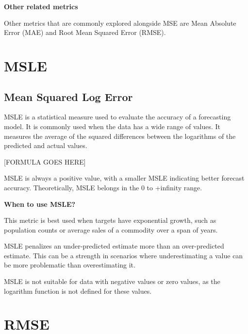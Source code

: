 \textbf{Other related metrics}

Other metrics that are commonly explored alongside MSE are Mean Absolute Error (MAE) and Root Mean Squared Error (RMSE).

\clearpage
\thispagestyle{regressionstyle}
\section{MSLE}
\subsection{Mean Squared Log Error}

MSLE is a statistical measure used to evaluate the accuracy of a forecasting model.
It is commonly used when the data has a wide range of values.
It measures the average of the squared differences between the logarithms of the predicted and actual values.

\begin{center}
    [FORMULA GOES HERE]
\end{center}
    
MSLE is always a positive value, with a smaller MSLE indicating better forecast accuracy. Theoretically, MSLE belongs in the 0 to +infinity range.

\textbf{When to use MSLE?}

This metric is best used when targets have exponential growth, such as population counts or average sales of a commodity over a span of years.

{
    \item MSLE penalizes an under-predicted estimate more than an over-predicted estimate. This can be a strength in scenarios where underestimating a value can be more problematic than overestimating it.
    \item MSLE is not suitable for data with negative values or zero values, as the logarithm function is not defined for these values.
}

\clearpage
\thispagestyle{regressionstyle}
\section{RMSE}
